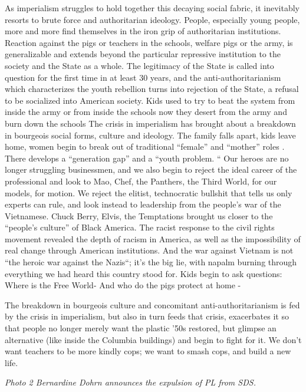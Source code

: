 \documentclass[12pt, titlepage]{article}
\begin{document}
{\begin{spacing}{1.10}
As imperialism struggles to hold together this decaying social fabric, it inevitably resorts to brute force and authoritarian ideology. People, especially young people, more and more find themselves in the iron grip of authoritarian institutions. Reaction against the pigs or teachers in the schools, welfare pigs or the army, is generalizable and extends beyond the particular repressive institution to the society and the State as a whole. The legitimacy of the State is called into question for the first time in at least 30 years, and the anti-authoritarianism which characterizes the youth rebellion turns into rejection of the State, a refusal to be socialized into American society. Kids used to try to beat the system from inside the army or from inside the schools now they desert from the army and burn down the schools The crisis in imperialism has brought about a breakdown in bourgeois social forms, culture and ideology. The family falls apart, kids leave home, women begin to break out of traditional ``female'' and ``mother'' roles . There develops a ``generation gap'' and a ``youth problem. `` Our heroes are no longer struggling businessmen, and we also begin to reject the ideal career of the professional and look to Mao, Chef, the Panthers, the Third World, for our models, for motion. We reject the elitist, technocratic bullshit that tells us only experts can rule, and look instead to leadership from the people's war of the Vietnamese. Chuck Berry, Elvis, the Temptations brought us closer to the ``people's culture'' of Black America. The racist response to the civil rights movement revealed the depth of racism in America, as well as the impossibility of real change through American institutions. And the war against Vietnam is not ``the heroic war against the Nazis``; it's the big lie, with napalm burning through everything we had heard this country stood for. Kids begin to ask questions: Where is the Free World- And who do the pigs protect at home -

The breakdown in bourgeois culture and concomitant anti-authoritarianism is fed by the crisis in imperialism, but also in turn feeds that crisis, exacerbates it so that people no longer merely want the plastic '50s restored, but glimpse an alternative (like inside the Columbia buildings) and begin to fight for it. We don't want teachers to be more kindly cops; we want to smash cops, and build a new life.

\textit{Photo 2 Bernardine Dohrn announces the expulsion of PL from SDS.}


\end{spacing}}
\end{document}

